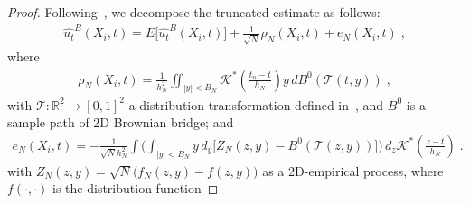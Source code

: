 \documentclass[a4paper,11pt]{article}
\begin{document}
\begin{proof}
Following~\cite{mack1982weak}, we decompose the truncated estimate as follows:
\begin{align*}
\widehat{u_t}^B(X_i,t)=E	\Big[\widehat{u_t}^B(X_i,t)\Big]+\frac{1}{\sqrt{N}}\rho_N(X_i,t)+e_N(X_i,t)\;,
\end{align*}
where 
\begin{align}
\rho_N(X_i,t)=\frac{1}{h_N^2}\iint_{|y|<B_N}	\mathcal{K}^*(\frac{t_n-t}{h_N})y\,dB^0(\mathcal{T}(t,y))\;,\label{eq.rhoterm}
\end{align}
with $\mathcal{T}:\mathbb{R}^2\to [0,1]^2$ a distribution transformation defined in~\cite{rosenblatt1952remarks}, and $B^0$ is a sample path of 2D Brownian bridge; and 
\begin{align}
e_N(X_i,t)=-\frac{1}{\sqrt{N}h_N^2}\int\Big(\int_{|y|<B_N}y\,d_y\big[Z_N(z,y)-B^0(\mathcal{T}(z,y))\big]\Big)\,d_z \mathcal{K}^*(\frac{z-t}{h_N})\;.	\label{eq.eterm}
\end{align}
with $Z_N(z,y) = \sqrt{N}\big(f_N(z,y)-f(z,y)\big)$ as a 2D-empirical process, where $f(\cdot,\cdot)$ is the distribution function 


\end{proof}
\end{document}
